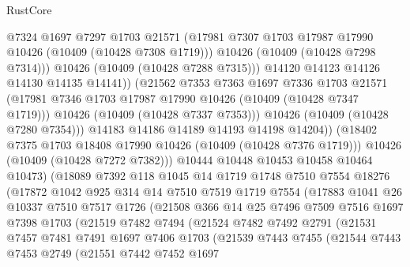 \begin{lexlean}{RustCore}
\begin{coremodule}
                        @7324
                        @1697
                        @7297
                        @1703
                        @21571
                        (@17981 @7307 @1703 @17987 @17990 @10426 (@10409 (@10428 @7308 @1719)))
                        @10426
                        (@10409 (@10428 @7298 @7314)))
                      @10426
                      (@10409 (@10428 @7288 @7315)))
                    @14120
                    @14123
                    @14126
                    @14130
                    @14135
                    @14141))
                (@21562
                  @7353
                  @7363
                  @1697
                  @7336
                  @1703
                  @21571
                  (@17981 @7346 @1703 @17987 @17990 @10426 (@10409 (@10428 @7347 @1719)))
                  @10426
                  (@10409 (@10428 @7337 @7353)))
                @10426
                (@10409 (@10428 @7280 @7354)))
              @14183
              @14186
              @14189
              @14193
              @14198
              @14204))
          (@18402 @7375 @1703 @18408 @17990 @10426 (@10409 (@10428 @7376 @1719)))
          @10426
          (@10409 (@10428 @7272 @7382)))
        @10444
        @10448
        @10453
        @10458
        @10464
        @10473)
      (@18089
        @7392
        @118
        @1045
        @14
        @1719
        @1748
        @7510
        @7554
        @18276
        (@17872
          @1042
          @925
          @314
          @14
          @7510
          @7519
          @1719
          @7554
          (@17883
            @1041
            @26
            @10337
            @7510
            @7517
            @1726
            (@21508
              @366
              @14
              @25
              @7496
              @7509
              @7516
              @1697
              @7398
              @1703
              (@21519
                @7482
                @7494
                (@21524
                  @7482
                  @7492
                  @2791
                  (@21531
                    @7457
                    @7481
                    @7491
                    @1697
                    @7406
                    @1703
                    (@21539
                      @7443
                      @7455
                      (@21544
                        @7443
                        @7453
                        @2749
                        (@21551
                          @7442
                          @7452
                          @1697

\end{coremodule}
\end{lexlean}
